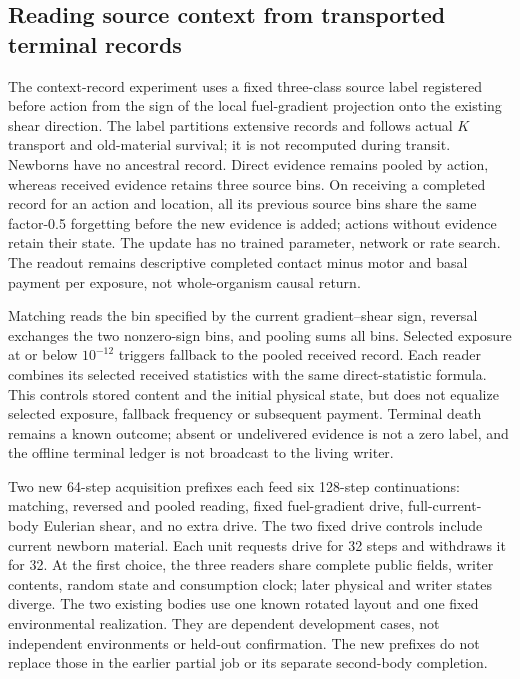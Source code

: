 \subsection*{Reading source context from transported terminal records}
The context-record experiment uses a fixed three-class source label registered before action from the sign of the local fuel-gradient projection onto the existing shear direction. The label partitions extensive records and follows actual $K$ transport and old-material survival; it is not recomputed during transit. Newborns have no ancestral record. Direct evidence remains pooled by action, whereas received evidence retains three source bins. On receiving a completed record for an action and location, all its previous source bins share the same factor-0.5 forgetting before the new evidence is added; actions without evidence retain their state. The update has no trained parameter, network or rate search. The readout remains descriptive completed contact minus motor and basal payment per exposure, not whole-organism causal return.

Matching reads the bin specified by the current gradient--shear sign, reversal exchanges the two nonzero-sign bins, and pooling sums all bins. Selected exposure at or below $10^{-12}$ triggers fallback to the pooled received record. Each reader combines its selected received statistics with the same direct-statistic formula. This controls stored content and the initial physical state, but does not equalize selected exposure, fallback frequency or subsequent payment. Terminal death remains a known outcome; absent or undelivered evidence is not a zero label, and the offline terminal ledger is not broadcast to the living writer.

Two new 64-step acquisition prefixes each feed six 128-step continuations: matching, reversed and pooled reading, fixed fuel-gradient drive, full-current-body Eulerian shear, and no extra drive. The two fixed drive controls include current newborn material. Each unit requests drive for 32 steps and withdraws it for 32. At the first choice, the three readers share complete public fields, writer contents, random state and consumption clock; later physical and writer states diverge. The two existing bodies use one known rotated layout and one fixed environmental realization. They are dependent development cases, not independent environments or held-out confirmation. The new prefixes do not replace those in the earlier partial job or its separate second-body completion.

